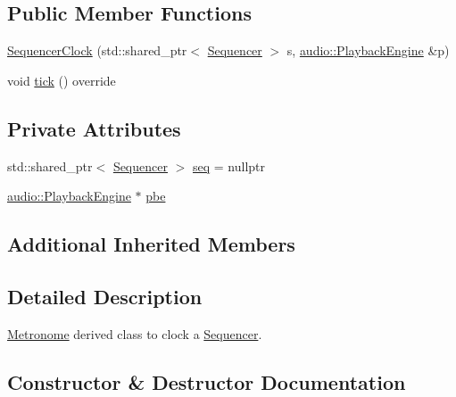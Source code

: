 \subsection*{Public Member Functions}
\begin{DoxyCompactItemize}
\item 
\hyperlink{classdrumpi_1_1SequencerClock_a587ae7c0480f05a728b41d99a028c80b}{Sequencer\+Clock} (std\+::shared\+\_\+ptr$<$ \hyperlink{classdrumpi_1_1Sequencer}{Sequencer} $>$ s, \hyperlink{classdrumpi_1_1audio_1_1PlaybackEngine}{audio\+::\+Playback\+Engine} \&p)
\item 
void \hyperlink{classdrumpi_1_1SequencerClock_ac75142ddc2ee0dcd3c52d13e44b0d85f}{tick} () override
\end{DoxyCompactItemize}
\subsection*{Private Attributes}
\begin{DoxyCompactItemize}
\item 
std\+::shared\+\_\+ptr$<$ \hyperlink{classdrumpi_1_1Sequencer}{Sequencer} $>$ \hyperlink{classdrumpi_1_1SequencerClock_aa6dc6e6c44fd5ba2e3a5456db8692915}{seq} = nullptr
\item 
\hyperlink{classdrumpi_1_1audio_1_1PlaybackEngine}{audio\+::\+Playback\+Engine} $\ast$ \hyperlink{classdrumpi_1_1SequencerClock_ae3ec41e6da35975b98942f110dc0e6dc}{pbe}
\end{DoxyCompactItemize}
\subsection*{Additional Inherited Members}


\subsection{Detailed Description}
\hyperlink{classdrumpi_1_1clock_1_1Metronome_acc6e0b5140c79326682ec62eb879bf37}{Metronome} derived class to clock a \hyperlink{classdrumpi_1_1Sequencer}{Sequencer}. 

\subsection{Constructor \& Destructor Documentation}
\mbox{\label{classdrumpi_1_1SequencerClock_a587ae7c0480f05a728b41d99a028c80b}} 
